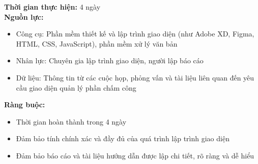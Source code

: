 {\begin{minipage}{\textwidth}
\begin{itemize}
    \end{itemize}
    \noindent \textbf{Thời gian thực hiện:} 4 ngày \\
    \noindent \textbf{Nguồn lực:}
    \begin{itemize}
        \item Công cụ: Phần mềm thiết kế và lập trình giao diện (như Adobe XD, Figma, HTML, CSS, JavaScript), phần mềm xử lý văn bản
        \item Nhân lực: Chuyên gia lập trình giao diện, người lập báo cáo
        \item Dữ liệu: Thông tin từ các cuộc họp, phỏng vấn và tài liệu liên quan đến yêu cầu giao diện quản lý phần chấm công
    \end{itemize}
    \noindent \textbf{Ràng buộc:}
    \begin{itemize}
        \item Thời gian hoàn thành trong 4 ngày
        \item Đảm bảo tính chính xác và đầy đủ của quá trình lập trình giao diện
        \item Đảm bảo báo cáo và tài liệu hướng dẫn được lập chi tiết, rõ ràng và dễ hiểu
    \end{itemize}
    \end{minipage}
}
\newpage
{}    
